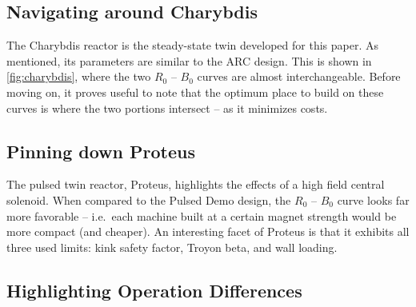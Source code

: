 \begin{table}[h!]
\begin{subtable}[t]{0.5\textwidth}
\begin{tabular}{ c|c }
\end{tabular}
\end{subtable}
\hfill
\hfill
\label{table:proteus}
\end{table}

\clearpage

\newpage

\subsection{Navigating around Charybdis}

The Charybdis reactor is the steady-state twin developed for this paper. As mentioned, its parameters are similar to the ARC design. This is shown in \cref{fig:charybdis}, where the two $R_0$ -- $B_0$ curves are almost interchangeable. Before moving on, it proves useful to note that the optimum place to build on these curves is where the two portions intersect -- as it minimizes costs. 

\subsection{Pinning down Proteus}

The pulsed twin reactor, Proteus, highlights the effects of a high field central solenoid. When compared to the Pulsed Demo design, the $R_0$ -- $B_0$ curve looks far more favorable -- i.e.\ each machine built at a certain magnet strength would be more compact (and cheaper). An interesting facet of Proteus is that it exhibits all three used limits: kink safety factor, Troyon beta, and wall loading.  

\subsection{Highlighting Operation Differences}

\label{subsection:operation_differences}



